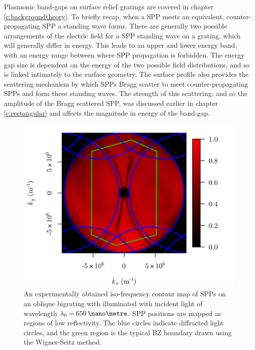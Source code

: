 Plasmonic band-gaps on surface relief gratings are covered in chapter \ref{c:backgroundtheory}. To briefly recap, when a SPP meets an equivalent, counter-propagating SPP a standing wave forms. There are generally two possible arrangements of the electric field  for a SPP standing wave on a grating, which will generally differ in energy. This leads to an upper and lower energy band, with an energy range between where SPP propagation is forbidden.
The energy gap size is dependent on the energy of the two possible field distributions, and so is linked intimately to the surface geometry. The surface profile also provides the scattering mechanism by which SPPs Bragg scatter to meet counter-propagating SPPs and form these standing waves. The strength of this scattering, and so the amplitude of the Bragg scattered SPP, was discussed earlier in chapter \ref{c:rectangular} and affects the magnitude in energy of the band-gap.

\begin{figure}
\begin{center}
\includegraphics[width=0.7\linewidth]{figure-650nm-scattergram-withBZ}
\end{center}
\caption[An experimentally obtained iso-frequency contour map of SPPs on an oblique bigrating with illuminated with incident light of wavelength $\lambda_0=650\:\nano\metre$.]{An experimentally obtained iso-frequency contour map of SPPs on an oblique bigrating with illuminated with incident light of wavelength $\lambda_0=650\:\nano\metre$. SPP positions are mapped as regions of low reflectivity. The blue circles indicate diffracted light circles, and the green region is the typical BZ boundary drawn using the Wigner-Seitz method.\label{fig:ob-650scatterALL}}
\end{figure}

